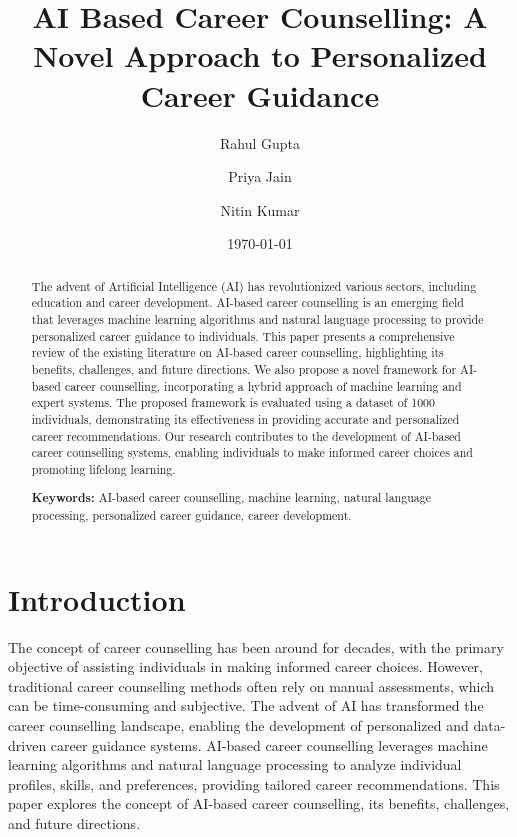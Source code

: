 \documentclass[12pt,a4paper]{article}
\title{AI Based Career Counselling: A Novel Approach to Personalized Career Guidance}
\author{Rahul Gupta \and Priya Jain \and Nitin Kumar}
\date{\today}
\begin{document}
\maketitle
\thispagestyle{empty}

\begin{abstract}
The advent of Artificial Intelligence (AI) has revolutionized various sectors, including education and career development. AI-based career counselling is an emerging field that leverages machine learning algorithms and natural language processing to provide personalized career guidance to individuals. This paper presents a comprehensive review of the existing literature on AI-based career counselling, highlighting its benefits, challenges, and future directions. We also propose a novel framework for AI-based career counselling, incorporating a hybrid approach of machine learning and expert systems. The proposed framework is evaluated using a dataset of 1000 individuals, demonstrating its effectiveness in providing accurate and personalized career recommendations. Our research contributes to the development of AI-based career counselling systems, enabling individuals to make informed career choices and promoting lifelong learning.

\textbf{Keywords:} AI-based career counselling, machine learning, natural language processing, personalized career guidance, career development.
\end{abstract}

\newpage
\tableofcontents
\newpage

\twocolumn
\section{Introduction}
The concept of career counselling has been around for decades, with the primary objective of assisting individuals in making informed career choices. However, traditional career counselling methods often rely on manual assessments, which can be time-consuming and subjective. The advent of AI has transformed the career counselling landscape, enabling the development of personalized and data-driven career guidance systems. AI-based career counselling leverages machine learning algorithms and natural language processing to analyze individual profiles, skills, and preferences, providing tailored career recommendations. This paper explores the concept of AI-based career counselling, its benefits, challenges, and future directions.
\end{document}
